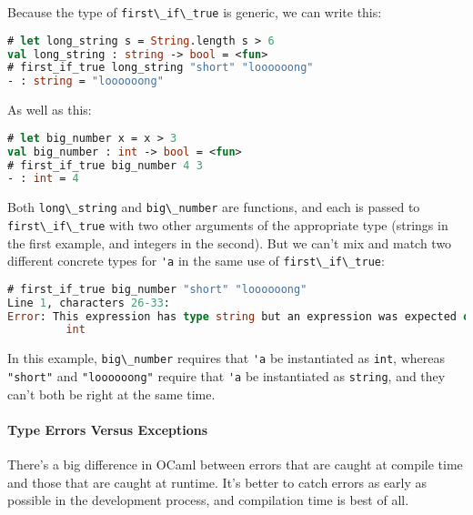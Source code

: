 Because the type of \passthrough{\lstinline!first\_if\_true!} is
generic, we can write this:

\begin{lstlisting}[language=Caml]
# let long_string s = String.length s > 6
val long_string : string -> bool = <fun>
# first_if_true long_string "short" "loooooong"
- : string = "loooooong"
\end{lstlisting}

As well as this:

\begin{lstlisting}[language=Caml]
# let big_number x = x > 3
val big_number : int -> bool = <fun>
# first_if_true big_number 4 3
- : int = 4
\end{lstlisting}

Both \passthrough{\lstinline!long\_string!} and
\passthrough{\lstinline!big\_number!} are functions, and each is passed
to \passthrough{\lstinline!first\_if\_true!} with two other arguments of
the appropriate type (strings in the first example, and integers in the
second). But we can't mix and match two different concrete types for
\passthrough{\lstinline!'a!} in the same use of
\passthrough{\lstinline!first\_if\_true!}:

\begin{lstlisting}[language=Caml]
# first_if_true big_number "short" "loooooong"
Line 1, characters 26-33:
Error: This expression has type string but an expression was expected of type
         int
\end{lstlisting}

In this example, \passthrough{\lstinline!big\_number!} requires that
\passthrough{\lstinline!'a!} be instantiated as
\passthrough{\lstinline!int!}, whereas \passthrough{\lstinline!"short"!}
and \passthrough{\lstinline!"loooooong"!} require that
\passthrough{\lstinline!'a!} be instantiated as
\passthrough{\lstinline!string!}, and they can't both be right at the
same time.

\hypertarget{type-errors-versus-exceptions}{%
\paragraph{Type Errors Versus
Exceptions}\label{type-errors-versus-exceptions}}

There's a big difference in OCaml between errors that are caught at
compile time and those that are caught at runtime. It's better to catch
errors as early as possible in the development process, and compilation
time is best of
all.


